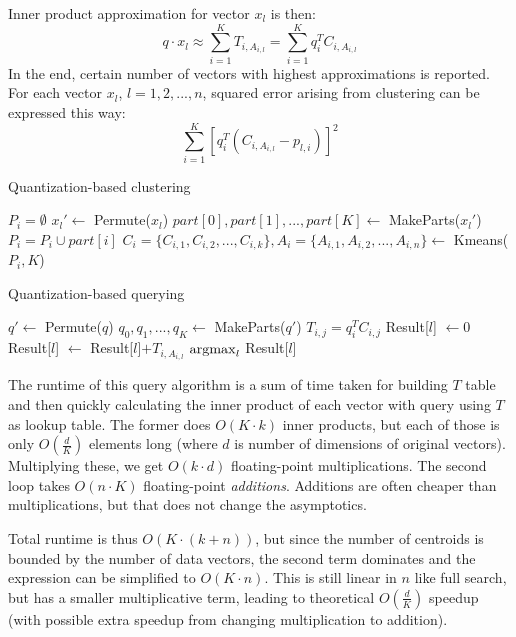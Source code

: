 Inner product approximation for vector $x_l$ is then:
$$q \cdot x_l \approx \sum_{i=1}^{K} T_{i,A_{i,l}} = \sum_{i=1}^{K} q_i^T C_{i,A_{i,l}}$$
In the end, certain number of vectors with highest approximations is reported.
For each vector $x_l$, $l = 1,2,...,n$, squared error arising from clustering can be expressed this way:
$$ \sum_{i=1}^{K}  [q_{i}^{T} (C_{i, A_{i,l}} - p_{l,i})]^2$$

\begin{algorithm}
	\caption{Quantization-based clustering}
	\begin{algorithmic}
			\State $P_i = \emptyset$
		\EndFor
			\State $x_l' \gets$ Permute($x_l$)
			\State $part[0], part[1], ..., part[K] \gets$ MakeParts($x_l'$)
				\State $P_i = P_i \cup part[i]$
			\EndFor
		\EndFor
			\State $C_i = \{C_{i,1}, C_{i,2}, ..., C_{i,k}\}, A_i = \{A_{i,1}, A_{i,2}, ..., A_{i,n}\} \gets$ Kmeans($P_i, K$)
		\EndFor
	\end{algorithmic}
\end{algorithm}

\begin{algorithm}
	\caption{Quantization-based querying}
	\begin{algorithmic}
		\State $q' \gets$ Permute($q$)
		\State $q_0, q_1, ..., q_K \gets$ MakeParts($q'$)
		\For{$i = 0, 1, ..., K$}
			\For{$j = 0, 1, ..., k$}
				\State $T_{i,j} = q_i^T C_{i,j}$
			\EndFor
		\EndFor
		\For{$l = 0, 1, ..., n$}
			\State Result[$l$] $\gets 0$
			\For{$i = 0, 1, ..., K$}
				\State Result[$l$] $\gets$ Result[$l$]$+ T_{i,A_{i,l}}$
			\EndFor
		\EndFor
		\State \Return $\operatorname*{argmax}_{l}$ Result[$l$]
	\end{algorithmic}
\end{algorithm}

The runtime of this query algorithm is a sum of time taken for building $T$ table and then
quickly calculating the inner product of each vector with query using $T$ as lookup table.
The former does $O(K \cdot k)$ inner products, but each of those is only $O(\frac{d}{K})$
elements long (where $d$ is number of dimensions of original vectors). 
Multiplying these, we get $O(k \cdot d)$ floating-point multiplications.
The second loop takes $O(n \cdot K)$ floating-point \textit{additions}. Additions are often
cheaper than multiplications, but that does not change the asymptotics.

Total runtime is thus $O(K \cdot (k + n))$, but since the number of centroids is bounded by
the number of data vectors, the second term dominates and the expression can be simplified to
$O(K \cdot n)$. This is still linear in $n$ like full search, but has a smaller multiplicative
term, leading to theoretical $O(\frac{d}{K})$ speedup (with possible extra speedup from changing
multiplication to addition).
